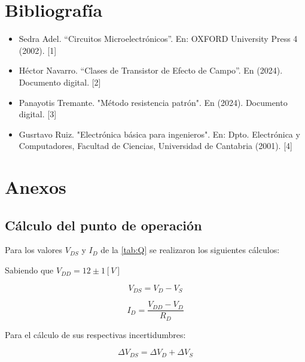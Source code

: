 \documentclass[12pt, a4paper]{article}
\begin{document}
    \newpage

    \section{Bibliografía}

    \begin{itemize}
        \item Sedra Adel. “Circuitos Microelectrónicos”. En: OXFORD University Press 4 (2002). [1]
        \item Héctor Navarro. “Clases de Transistor de Efecto de Campo”. En (2024). Documento digital. [2]
        \item Panayotis Tremante. "Método resistencia patrón". En (2024). Documento digital. [3]
        \item Gusrtavo Ruiz. "Electrónica básica para ingenieros". En: Dpto. Electrónica y Computadores, Facultad de Ciencias, Universidad de Cantabria (2001). [4]
    \end{itemize}
    
    \printbibliography

    \newpage

    \section{Anexos}

    \subsection{Cálculo del punto de operación}

    Para los valores $V_{DS}$ y $I_D$ de la \ref{tab:Q} se realizaron los siguientes cálculos:

    Sabiendo que $V_{DD} = 12 \pm 1 [V]$

    \begin{equation}
        V_{DS} = V_D - V_S
        \label{Qeq1}
    \end{equation}

    \begin{equation}
        I_D = \frac{V_{DD} - V_D}{R_D}
        \label{Qeq2}
    \end{equation}

    Para el cálculo de sus respectivas incertidumbres:

    \begin{equation}
        \Delta V_{DS} = \Delta V_D + \Delta V_S
        \label{Qeq3}
    \end{equation}
\end{document}
